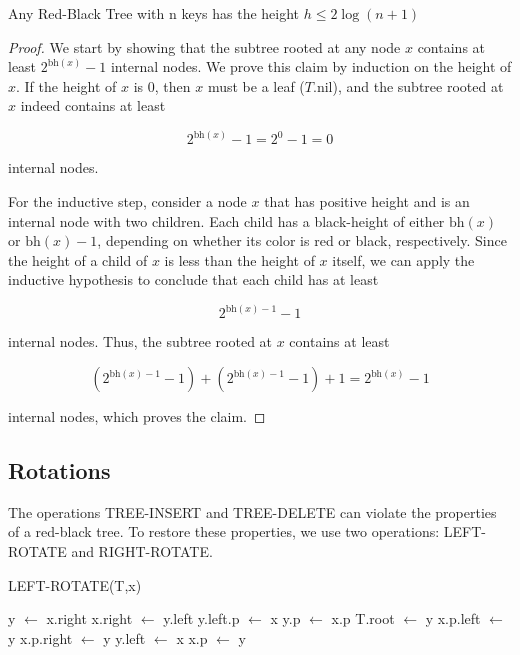 \newtheorem{RBT}{theorem}
\begin{theorem}
    Any Red-Black Tree with n keys has the height $h \leq 2\log(n+1)$
\end{theorem}
\begin{proof}
    We start by showing that the subtree rooted at any node $x$ contains at least $2^{\text{bh}(x)} - 1$ internal nodes. We prove this claim by induction on the height of $x$. If the height of $x$ is $0$, then $x$ must be a leaf ($T.\text{nil}$), and the subtree rooted at $x$ indeed contains at least 

    $$
    2^{\text{bh}(x)} - 1 = 2^0 - 1 = 0
    $$

    internal nodes.

    For the inductive step, consider a node $x$ that has positive height and is an internal node with two children. Each child has a black-height of either $\text{bh}(x)$ or $\text{bh}(x) - 1$, depending on whether its color is red or black, respectively. Since the height of a child of $x$ is less than the height of $x$ itself, we can apply the inductive hypothesis to conclude that each child has at least 

    $$
    2^{\text{bh}(x)-1} - 1
    $$ 

    internal nodes. Thus, the subtree rooted at $x$ contains at least 

    $$
    \left(2^{\text{bh}(x)-1} - 1\right) + \left(2^{\text{bh}(x)-1} - 1\right) + 1 = 2^{\text{bh}(x)} - 1
    $$ 

    internal nodes, which proves the claim.
\end{proof}

\vspace{-1em}

\subsection*{Rotations}

The operations TREE-INSERT and TREE-DELETE can violate the properties of a red-black tree. To restore these properties, we use two operations: LEFT-ROTATE and RIGHT-ROTATE.

\begin{algorithm}[H]
    \caption{LEFT-ROTATE(T,x)}
    \begin{algorithmic}[1]
        \State y $\gets$ x.right
        \State x.right $\gets$ y.left
            \State y.left.p $\gets$ x
        \EndIf
        \State y.p $\gets$ x.p
            \State T.root $\gets$ y
            \State x.p.left $\gets$ y
        \Else
            \State x.p.right $\gets$ y
        \EndIf
        \State y.left $\gets$ x
        \State x.p $\gets$ y
    \end{algorithmic}
\end{algorithm}

